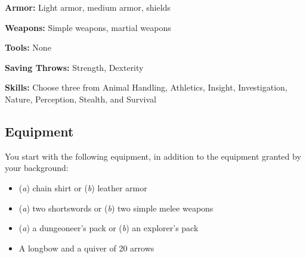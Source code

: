 \textbf{Armor:} Light armor, medium armor, shields

\textbf{Weapons:} Simple weapons, martial weapons

\textbf{Tools:} None

\textbf{Saving Throws:} Strength, Dexterity

\textbf{Skills:} Choose three from Animal Handling, Athletics, Insight, Investigation, Nature, Perception, Stealth, and Survival

\subsection{Equipment}

You start with the following equipment, in addition to the equipment granted by your background:
\begin{itemize}
\item (\textit{a}) chain shirt or (\textit{b}) leather armor
\item (\textit{a}) two shortswords or (\textit{b}) two simple melee weapons
\item (\textit{a}) a dungeoneer's pack or (\textit{b}) an explorer's pack
\item A longbow and a quiver of 20 arrows
\end{itemize}

